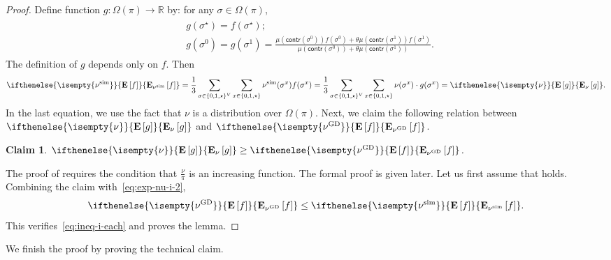 \documentclass[11pt,a4paper]{article}
\newtheorem{claim}[theorem]{Claim}
\theoremstyle{definition}
\newcommand{\nug}{\nu^{\textnormal{GD}}}
\newcommand{\nus}{\nu^{\textnormal{sim}}}
\newcommand{\E}[2][]{ \ifthenelse{\isempty{#1}}
  {\mathbf{\mathbf{E}}\left[#2\right]}
  {\mathbf{\mathbf{E}}_{#1}\left[#2\right]} }
\begin{document}
\begin{proof}
Define function $g:\Omega(\pi)\to \mathbb{R}$ by: for any $\sigma\in\Omega(\pi)$,
\begin{align}\label{def:g-i}
\begin{split}
&g(\sigma^\star)=f(\sigma^\star);\\
&g(\sigma^0)=g(\sigma^1)=\frac{ \mu(\textsf{contr}(\sigma^0))f(\sigma^0)+\theta \mu(\textsf{contr}(\sigma^1))f(\sigma^1)}{\mu(\textsf{contr}(\sigma^0))+\theta \mu(\textsf{contr}(\sigma^1))}. 
\end{split}
\end{align}
The definition of $g$ depends only on $f$. Then
\begin{align}\label{eq:exp-nu-i-2}
\E[\nus]{f} = \frac{1}{3} \sum_{\sigma\in \{0,1,\star\}^V}\sum_{x\in\{0,1,\star\} } \nus(\sigma^x)f(\sigma^x) = \frac{1}{3} \sum_{\sigma\in \{0,1,\star\}^V}\sum_{x\in\{0,1,\star\} } \nu(\sigma^x)\cdot g(\sigma^x) =  \E[\nu]{g}.
\end{align}
In the last equation, we use the fact that $\nu$ is a distribution over $\Omega(\pi)$.
Next, we claim the following relation between $\E[\nu]{g}$ and $\E[\nug]{f}$.
\begin{claim}\label{claim:g-i-f}
$\E[\nu]{g}\geq \E[\nug]{f}$.
\end{claim}
The proof of  requires the condition that $\frac{\nu}{\pi}$ is an increasing function. The formal proof is given later.
Let us first assume that  holds.
Combining the claim with~\eqref{eq:exp-nu-i-2},
\begin{align}\label{eq:ineq-i-each-2}
  \E[\nug]{f}\leq \E[\nus]{f}.
\end{align}
This verifies~\eqref{eq:ineq-i-each} and proves the lemma.
\end{proof}

We finish the proof by proving the technical claim.
\end{document}
